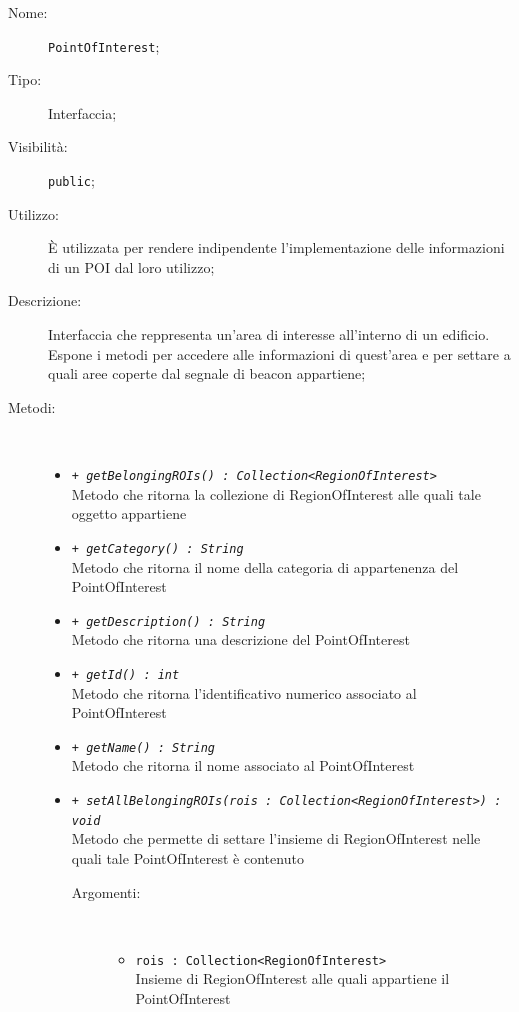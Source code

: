 \documentclass[../DefinizioneDiProdotto.tex]{subfiles}
\begin{document}
    \begin{description}
\item[Nome:] \texttt{PointOfInterest};
\item[Tipo:] Interfaccia;
\item[Visibilità:] \texttt{public};
\item[Utilizzo:] È utilizzata per rendere indipendente l'implementazione delle informazioni di un POI dal loro utilizzo;
\item[Descrizione:] Interfaccia che reppresenta un'area di interesse all'interno di un edificio. Espone i metodi per accedere alle informazioni di quest'area e per settare a quali aree coperte dal segnale di beacon appartiene;
\item[Metodi:] \
\begin{itemize}
\item \texttt{+ \textit{getBelongingROIs() : Collection<RegionOfInterest>}}\\
Metodo che ritorna la collezione di RegionOfInterest alle quali tale oggetto appartiene
 \item \texttt{+ \textit{getCategory() : String}}\\
Metodo che ritorna il nome della categoria di appartenenza del PointOfInterest
 \item \texttt{+ \textit{getDescription() : String}}\\
Metodo che ritorna una descrizione del PointOfInterest
 \item \texttt{+ \textit{getId() : int}}\\
Metodo che ritorna l'identificativo numerico associato al PointOfInterest
 \item \texttt{+ \textit{getName() : String}}\\
Metodo che ritorna il nome associato al PointOfInterest
 \item \texttt{+ \textit{setAllBelongingROIs(rois : Collection<RegionOfInterest>) : void}}\\
Metodo che permette di settare l'insieme di RegionOfInterest nelle quali tale PointOfInterest è contenuto
 \begin{description}
\item[Argomenti:] \
\begin{itemize}
\item \texttt{rois : Collection<RegionOfInterest>}\\
Insieme di RegionOfInterest alle quali appartiene il PointOfInterest\end{itemize}
\end{description}
\end{itemize}
\end{description}
\end{document}
